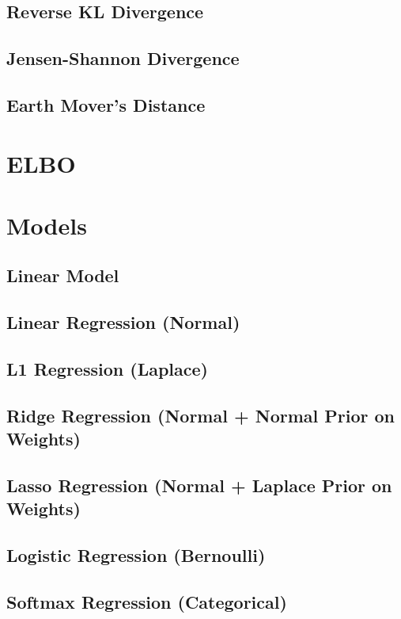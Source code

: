 \documentclass{article}
\begin{document}
\subsection{Reverse KL Divergence}
\subsection{Jensen-Shannon Divergence}
\subsection{Earth Mover's Distance}

\section{ELBO}

\section{Models}
\subsection{Linear Model}
\subsection{Linear Regression (Normal)}
\subsection{L1 Regression (Laplace)}
\subsection{Ridge Regression (Normal + Normal Prior on Weights)}
\subsection{Lasso Regression (Normal + Laplace Prior on Weights)}
\subsection{Logistic Regression (Bernoulli)}
\subsection{Softmax Regression (Categorical)}
\end{document}

